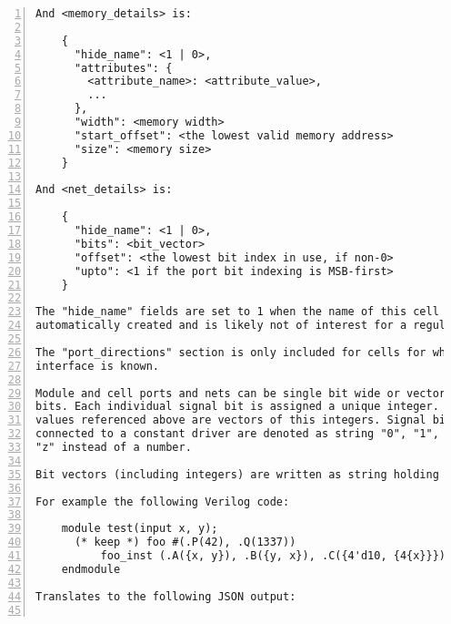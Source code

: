 \begin{lstlisting}[numbers=left,frame=single]
And <memory_details> is:

    {
      "hide_name": <1 | 0>,
      "attributes": {
        <attribute_name>: <attribute_value>,
        ...
      },
      "width": <memory width>
      "start_offset": <the lowest valid memory address>
      "size": <memory size>
    }

And <net_details> is:

    {
      "hide_name": <1 | 0>,
      "bits": <bit_vector>
      "offset": <the lowest bit index in use, if non-0>
      "upto": <1 if the port bit indexing is MSB-first>
    }

The "hide_name" fields are set to 1 when the name of this cell or net is
automatically created and is likely not of interest for a regular user.

The "port_directions" section is only included for cells for which the
interface is known.

Module and cell ports and nets can be single bit wide or vectors of multiple
bits. Each individual signal bit is assigned a unique integer. The <bit_vector>
values referenced above are vectors of this integers. Signal bits that are
connected to a constant driver are denoted as string "0", "1", "x", or
"z" instead of a number.

Bit vectors (including integers) are written as string holding the binaryrepresentation of the value. Strings are written as strings, with an appendedblank in cases of strings of the form /[01xz]* */.

For example the following Verilog code:

    module test(input x, y);
      (* keep *) foo #(.P(42), .Q(1337))
          foo_inst (.A({x, y}), .B({y, x}), .C({4'd10, {4{x}}}));
    endmodule

Translates to the following JSON output:


\end{lstlisting}
